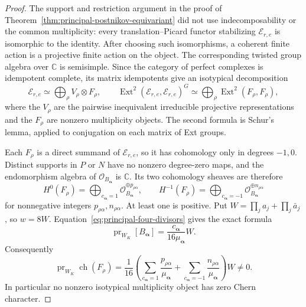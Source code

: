 \documentclass[11pt]{article}
\theoremstyle{definition}
\theoremstyle{remark}
\begin{document}
\begin{proof}
The support and restriction argument in the proof of
Theorem~\ref{thm:principal-postnikov-equivariant} did not use
indecomposability or the common multiplicity: every translation--Picard functor stabilizing
$\mathcal E_{r,e}$ is isomorphic to the identity.  After choosing
such isomorphisms, a coherent finite action is a projective
finite action on the object.  The corresponding twisted group
algebra over $\mathbb C$ is semisimple.  Since the category of
perfect complexes is idempotent complete, its matrix idempotents
give an isotypical decomposition
\begin{equation}
 \label{eq:principal-isotypical}
 \mathcal E_{r,e}\simeq\bigoplus_\rho V_\rho\otimes F_\rho,
 \qquad
 \operatorname{Ext}^2(\mathcal E_{r,e},\mathcal E_{r,e})^G
 \simeq\bigoplus_\rho\operatorname{Ext}^2(F_\rho,F_\rho),
\end{equation}
where the $V_\rho$ are the pairwise inequivalent irreducible
projective representations and the $F_\rho$ are nonzero
multiplicity objects.  The second formula is Schur's lemma,
applied to conjugation on each matrix of Ext groups.

Each $F_\rho$ is a direct summand of $\mathcal E_{r,e}$, so it has
cohomology only in degrees $-1,0$.  Distinct supports in $P$
or $N$ have no nonzero degree-zero maps, and the endomorphism
algebra of $\mathcal O_{B_{\boldsymbol\alpha}}$ is $\mathbb C$.
Its two cohomology sheaves are therefore
\[
 H^0(F_\rho)=\bigoplus_{c_{\boldsymbol\alpha}=1}
       \mathcal O_{B_{\boldsymbol\alpha}}^{\oplus p_{\rho\alpha}},
 \qquad
 H^{-1}(F_\rho)=\bigoplus_{c_{\boldsymbol\alpha}=-1}
       \mathcal O_{B_{\boldsymbol\alpha}}^{\oplus n_{\rho\alpha}}
\]
for nonnegative integers $p_{\rho\alpha},n_{\rho\alpha}$.
At least one is positive.  Put
$W=\prod_ja_j+\prod_j\bar a_j$, so $w=8W$.
Equation~\eqref{eq:principal-four-divisors} gives the exact formula
\[
 \operatorname{pr}_{W_K}[B_{\boldsymbol\alpha}]
       =\frac{c_{\boldsymbol\alpha}}{16\mu_{\boldsymbol\alpha}}W.
\]
Consequently
\begin{equation}
 \label{eq:principal-isotypical-positive}
 \operatorname{pr}_{W_K}\operatorname{ch}(F_\rho)
 =\frac1{16}\left(
    \sum_{c_{\boldsymbol\alpha}=1}
                \frac{p_{\rho\alpha}}{\mu_{\boldsymbol\alpha}}
   +\sum_{c_{\boldsymbol\alpha}=-1}
                \frac{n_{\rho\alpha}}{\mu_{\boldsymbol\alpha}}
                  \right)W\ne0.
\end{equation}
In particular no nonzero isotypical multiplicity object has
zero Chern character.


\end{proof}
\end{document}
